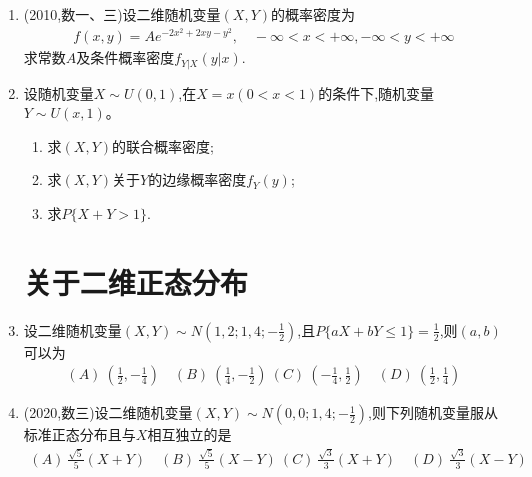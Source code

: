 \documentclass[12pt, a4paper, oneside, UTF8]{ctexbook}
\begin{document}
\begin{enumerate}[label=\arabic*.,start=3]
    \item (2010,数一、三)设二维随机变量$(X,Y)$的概率密度为
    \begin{align*}
        f(x,y)=Ae^{-2x^2+2xy-y^2}, \quad -\infty<x<+\infty, -\infty<y<+\infty
    \end{align*}
    求常数$A$及条件概率密度$f_{Y|X}(y|x)$.
    
    \begin{solution}
    \newpage
    \end{solution}
    
    \item 设随机变量$X\sim U(0,1)$,在$X=x(0<x<1)$的条件下,随机变量$Y\sim U(x,1)$。
    \begin{enumerate}
        \item 求$(X,Y)$的联合概率密度;
        \item 求$(X,Y)$关于$Y$的边缘概率密度$f_Y(y)$;
        \item 求$P\{X+Y>1\}$.
    \end{enumerate}
    
    \begin{solution}
    \newpage
    \end{solution}
    \section {关于二维正态分布}
    \item 设二维随机变量$(X,Y)\sim N(1,2;1,4;-\frac{1}{2})$,且$P\{aX+bY\leq 1\}=\frac{1}{2}$,则$(a,b)$可以为
    \begin{align*}
        (A)\ \left(\frac{1}{2},-\frac{1}{4}\right) \quad (B)\ \left(\frac{1}{4},-\frac{1}{2}\right)\ 
        (C)\ \left(-\frac{1}{4},\frac{1}{2}\right) \quad (D)\ \left(\frac{1}{2},\frac{1}{4}\right)
    \end{align*}
    
    \begin{solution}
    \newpage
    \end{solution}
    
    \item (2020,数三)设二维随机变量$(X,Y)\sim N(0,0;1,4;-\frac{1}{2})$,则下列随机变量服从标准正态分布且与$X$相互独立的是
    \begin{align*}
        (A)\ \frac{\sqrt{5}}{5}(X+Y) \quad (B)\ \frac{\sqrt{5}}{5}(X-Y) \ 
        (C)\ \frac{\sqrt{3}}{3}(X+Y) \quad (D)\ \frac{\sqrt{3}}{3}(X-Y)
    \end{align*}
    

\end{enumerate}
\end{document}
